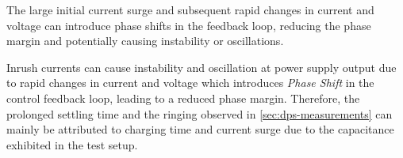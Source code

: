 The large initial current surge and subsequent rapid changes in current and
voltage can introduce phase shifts in the feedback loop, reducing the phase
margin and potentially causing instability or oscillations.

Inrush currents can cause instability and oscillation at power supply output
due to rapid changes in current and voltage which introduces \emph{Phase Shift}
in the control feedback loop, leading to a reduced phase margin.
Therefore, the prolonged settling time and the ringing observed in
\autoref{sec:dps-measurements} can mainly be attributed to charging time
and current surge due to the capacitance exhibited in the test setup.


